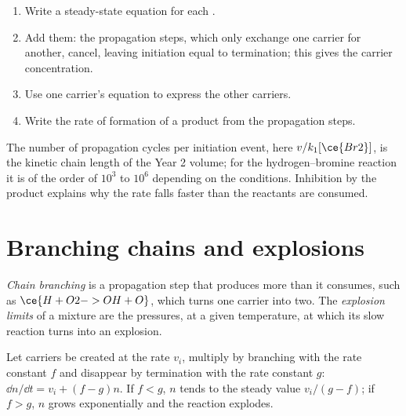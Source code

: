 \begin{method}\label{met:b3:complex-kinetics:steady-state-chain}
\begin{enumerate}
  \item Write a steady-state equation for each .
  \item Add them: the propagation steps, which only exchange one carrier for
        another, cancel, leaving initiation equal to termination; this gives the
        carrier concentration.
  \item Use one carrier's equation to express the other carriers.
  \item Write the rate of formation of a product from the propagation steps.
\end{enumerate}
\end{method}

The number of propagation cycles per initiation event, here $v/k_1[\ce{Br2}]$, is the
kinetic chain length of the Year 2 volume; for the hydrogen--bromine reaction
it is of the order of $10^3$ to $10^6$ depending on the conditions. Inhibition by
the product explains why the rate falls faster than the reactants are consumed.

\section{Branching chains and explosions}

\begin{definition}\label{def:b3:complex-kinetics:branching}
\emph{Chain branching} is a propagation step that produces
more  than it consumes, such as $\ce{H + O2 -> OH + O}$, which turns one
carrier into two. The \emph{explosion limits} of a mixture
are the pressures, at a given temperature, at which its slow reaction turns
into an explosion.
\end{definition}

\begin{proposition}\label{prop:b3:complex-kinetics:branching}
Let carriers be created at the rate $v_i$, multiply by branching with the rate
constant $f$ and disappear by termination with the rate constant $g$:
$\dd n/\dd t = v_i + (f - g)n$. If $f < g$, $n$ tends to the steady value $v_i/(g - f)$; if
$f > g$, $n$ grows exponentially and the reaction explodes.
\end{proposition}


